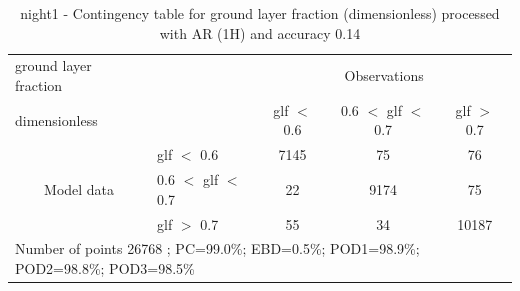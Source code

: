 \begin{table}[p!]
\begin{center}
\begin{tabular}{llccc}
\hline
{ground layer fraction}                                       &                                                    & \multicolumn{3}{c}{Observations}                 \\
{dimensionless}                                       &                             & glf $<$ 0.6   & 0.6 $<$ glf $<$ 0.7 & glf $>$ 0.7 \\
\hline
\multicolumn{1}{c}{\multirow{3}{*}{Model data}}  & glf $<$ 0.6             & 7145                & 75                       & 76              \\
                                                 & 0.6  $<$ glf $<$ 0.7 & 22                & 9174                       & 75              \\
                                                 & glf $>$ 0.7             & 55                & 34                       & 10187              \\
\hline
\multicolumn{5}{l}{ Number of points        26768 ; PC=99.0\%; EBD=0.5\%; POD1=98.9\%; POD2=98.8\%; POD3=98.5\%}
\end{tabular}
\end{center}
\caption{night1 - Contingency table for  ground layer fraction (dimensionless) processed with AR (1H) and accuracy 0.14}
\label{tab:contingencyglfAFT:night1}
\end{table}
